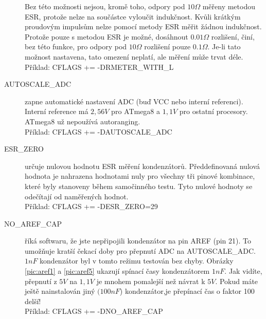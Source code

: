 \begin{description}
Bez této možnosti nejsou, kromě toho, odpory pod \(10\Omega\) měřeny metodou ESR,
protože  nelze na součástce vyloučit indukčnost.
Kvůli krátkým proudovým impulsům nelze pomocí metody ESR měřit žádnou indukčnost.
Protože pouze s metodou ESR je možné, dosáhnout \(0.01\Omega\) rozlišení, činí, bez této funkce,
pro odpory pod \(10\Omega\) rozlišení pouze \(0.1\Omega\).
Je-li tato možnost nastavena, tato omezení neplatí, ale měření může trvat déle.\\
Příklad: CFLAGS += -DRMETER\_WITH\_L
  \item[AUTOSCALE\_ADC] zapne automatické nastavení ADC (buď VCC nebo interní referenci).
Interní reference má \(2,56V\) pro ATmega8 a \(1,1V\) pro ostatní procesory.
ATmega8 už nepoužívá autoranging.\\
Příklad: CFLAGS += -DAUTOSCALE\_ADC
  \item[ESR\_ZERO] určuje nulovou hodnotu ESR měření kondenzátorů.
Předdefinovaná nulová hodnota je nahrazena hodnotami nuly pro všechny tři pinové kombinace,
které byly stanoveny během samočinného testu.
Tyto nulové hodnoty se odečítají od naměřených hodnot.\\
Příklad: CFLAGS += -DESR\_ZERO=29
  \item[NO\_AREF\_CAP]  říká softwaru, že jste nepřipojili kondenzátor na pin AREF (pin 21).
To umožňuje kratší čekací doby pro přepnutí ADC na AUTOSCALE\_ADC.
\(1nF\) kondenzátor byl v tomto režimu testován bez chyby.
Obrázky \ref{pic:aref1} a \ref{pic:aref5} ukazují spínací časy kondenzátorem \(1nF\).
Jak vidíte, přepnutí z \(5V\) na \(1,1V\) je mnohem pomalejší než návrat k \(5V\).
Pokud máte ještě nainstalován jiný \((100nF\)) kondenzátor,je přepínací čas o faktor 100 delší!\\
Příklad: CFLAGS += -DNO\_AREF\_CAP
\end{description}

